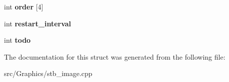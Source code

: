 \begin{DoxyCompactItemize}
\item 
\hypertarget{structjpeg_ac0f5240fc472e75239328f51a50f45b6}{int {\bfseries order} \mbox{[}4\mbox{]}}\label{structjpeg_ac0f5240fc472e75239328f51a50f45b6}

\item 
\hypertarget{structjpeg_ab13af34259b1f1c6cf8f35411a77e39e}{int {\bfseries restart\+\_\+interval}}\label{structjpeg_ab13af34259b1f1c6cf8f35411a77e39e}

\item 
\hypertarget{structjpeg_a6b4a8a352872847d84ea5ef1a4bc245e}{int {\bfseries todo}}\label{structjpeg_a6b4a8a352872847d84ea5ef1a4bc245e}

\end{DoxyCompactItemize}


The documentation for this struct was generated from the following file\+:\begin{DoxyCompactItemize}
\item 
src/\+Graphics/stb\+\_\+image.\+cpp\end{DoxyCompactItemize}
